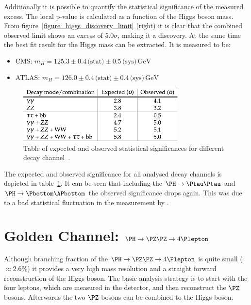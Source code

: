 Additionally it is possible to quantify the statistical significance of the measured excess.
The local p-value is calculated as a function of the Higgs boson mass. From figure~\ref{figure_higgs_discovery_limit} (right) it is clear
that the combined observed limit shows an excess of $5.0\sigma$, making it a discovery. At the same time the best fit result for the Higgs mass
can be extracted. It is measured to be:
\begin{itemize}
  \item CMS: $m_H= 125.3 \pm 0.4 \,\text{(stat)} \pm 0.5 \,\text{(sys)}\, \text{GeV}$~\cite{HiggsDiscovery_CMS}
  \item ATLAS: $m_H= 126.0 \pm 0.4 \, \text{(stat)} \pm 0.4 \, \text{(sys)}\, \text{GeV}$~\cite{HiggsDiscovery_ATLAS}
\end{itemize}


\begin{figure}[h]
\includegraphics[width=0.75\textwidth]{../plots/higgs_pvalue_table.pdf}
\caption[Higgs boson discovery CMS limit.]{Table of expected and observed statistical significances for different decay channel~\cite{HiggsDiscovery_CMS}.}
\label{figure_higgs_discovery_pvalue}
\end{figure}

The expected and observed significance for all analysed decay channels is depicted in table~\ref{figure_higgs_discovery_pvalue}. It can be seen that
including the $\PH \rightarrow \Ptau \Ptau$ and $\PH \rightarrow \Pbottom \APbottom$ the observed significance drops again. This was due to a bad statistical
fluctuation in the measurement by \CMS.


\section{Golden Channel: $\PH \rightarrow \PZ \PZ \rightarrow 4\Plepton$ \label{golden_channel}}

Although branching fraction of the $\PH \rightarrow \PZ \PZ \rightarrow 4\Plepton$ is quite small ($\approx2.6\%$) it provides a very high
mass resolution and a straight forward reconstruction of the Higgs boson. The basic analysis strategy is to start with the four leptons, which
are measured in the detector, and then reconstruct the $\PZ$ bosons. Afterwards the two $\PZ$ bosons can be combined to the Higgs boson.

